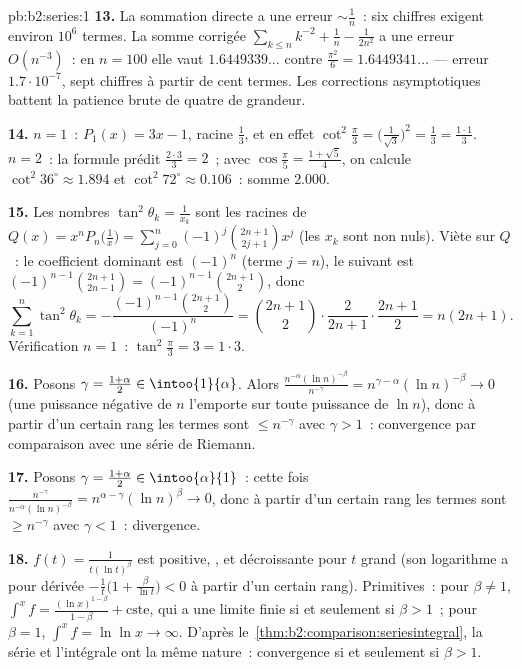 \begin{solution}{pb:b2:series:1}
\textbf{13.} La sommation directe a une erreur $\sim \frac1n$~: six
chiffres exigent environ $10^6$ termes. La somme corrigée
$\sum_{k\leq n}k^{-2} + \frac1n - \frac1{2n^2}$ a une erreur
$O(n^{-3})$~: en $n = 100$ elle vaut $1.6449339\dots$ contre
$\frac{\pi^2}6 = 1.6449341\dots$ --- erreur $1.7\cdot10^{-7}$,
sept chiffres à partir de cent termes. Les corrections asymptotiques
battent la patience brute de quatre  de grandeur.

\textbf{14.} $n = 1$~: $P_1(x) = 3x - 1$, racine $\frac13$, et
en effet $\cot^2\frac\pi3 = \bigl(\frac1{\sqrt3}\bigr)^2 =
\frac13 = \frac{1\cdot1}3$. $n = 2$~: la formule prédit
$\frac{2\cdot3}3 = 2$~; avec $\cos\frac\pi5 = \frac{1 +
\sqrt5}{4}$, on calcule $\cot^2 36^\circ \approx 1.894$ et
$\cot^2 72^\circ \approx 0.106$~: somme $2.000$.

\textbf{15.} Les nombres $\tan^2\theta_k = \frac1{x_k}$ sont les
racines de $Q(x) = x^nP_n\bigl(\frac1x\bigr) =
\sum_{j=0}^n(-1)^j\binom{2n+1}{2j+1}x^j$ (les $x_k$ sont non nuls).
Viète sur $Q$~: le coefficient dominant est $(-1)^n$ (terme $j = n$),
le suivant est $(-1)^{n-1}\binom{2n+1}{2n-1} =
(-1)^{n-1}\binom{2n+1}{2}$, donc
\[
\sum_{k=1}^n\tan^2\theta_k =
-\frac{(-1)^{n-1}\binom{2n+1}2}{(-1)^n} = \binom{2n+1}2\cdot
\frac{2}{2n+1}\cdot\frac{2n+1}{2}
= n(2n+1).
\]
Vérification $n = 1$~: $\tan^2\frac\pi3 = 3 = 1\cdot3$.

\textbf{16.} Posons $\gamma = \frac{1+\alpha}2 \in
\intoo{1}{\alpha}$. Alors $\frac{n^{-\alpha}(\ln
n)^{-\beta}}{n^{-\gamma}} = n^{\gamma - \alpha}(\ln n)^{-\beta}
\to 0$ (une puissance négative de $n$ l'emporte sur toute puissance
de $\ln n$), donc à partir d'un certain rang les termes sont $\leq
n^{-\gamma}$ avec $\gamma > 1$~: convergence par comparaison avec une
série de Riemann.

\textbf{17.} Posons $\gamma = \frac{1+\alpha}2 \in
\intoo{\alpha}{1}$~: cette fois $\frac{n^{-\gamma}}{n^{-\alpha}(\ln
n)^{-\beta}} = n^{\alpha-\gamma}(\ln n)^{\beta} \to 0$, donc à partir
d'un certain rang les termes sont $\geq n^{-\gamma}$ avec $\gamma <
1$~: divergence.

\textbf{18.} $f(t) = \frac1{t(\ln t)^\beta}$ est positive, ,
et décroissante pour $t$ grand (son logarithme a pour dérivée
$-\frac1t\bigl(1 + \frac{\beta}{\ln t}\bigr) < 0$ à partir d'un
certain rang). Primitives~: pour $\beta \neq 1$,
$\int^x f = \frac{(\ln x)^{1-\beta}}{1-\beta} + \text{cste}$, qui a
une limite finie si et seulement si $\beta > 1$~; pour $\beta = 1$,
$\int^x f = \ln\ln x \to \infty$. D'après
le~\cref{thm:b2:comparison:seriesintegral}, la série et l'intégrale
ont la même nature~: convergence si et seulement si $\beta > 1$.


\end{solution}
